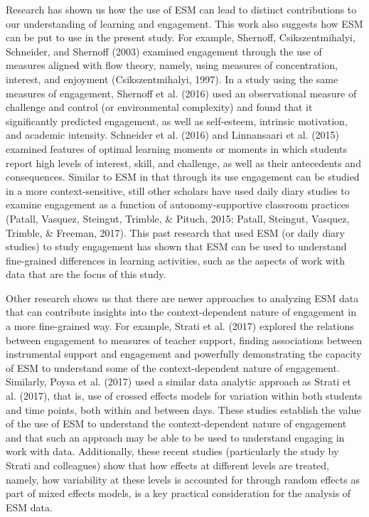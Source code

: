 \documentclass[]{msu-thesis}
\theoremstyle{definition}
\theoremstyle{definition}
\theoremstyle{definition}
\theoremstyle{remark}
\begin{document}
Research has shown us how the use of ESM can lead to distinct
contributions to our understanding of learning and engagement. This work
also suggests how ESM can be put to use in the present study. For
example, Shernoff, Csikszentmihalyi, Schneider, and Shernoff (2003)
examined engagement through the use of measures aligned with flow
theory, namely, using measures of concentration, interest, and enjoyment
(Csikszentmihalyi, 1997). In a study using the same measures of
engagement, Shernoff et al. (2016) used an observational measure of
challenge and control (or environmental complexity) and found that it
significantly predicted engagement, as well as self-esteem, intrinsic
motivation, and academic intensity. Schneider et al. (2016) and
Linnansaari et al. (2015) examined features of optimal learning moments
or moments in which students report high levels of interest, skill, and
challenge, as well as their antecedents and consequences. Similar to ESM
in that through its use engagement can be studied in a more
context-sensitive, still other scholars have used daily diary studies to
examine engagement as a function of autonomy-supportive classroom
practices (Patall, Vasquez, Steingut, Trimble, \& Pituch, 2015; Patall,
Steingut, Vasquez, Trimble, \& Freeman, 2017). This past research that
used ESM (or daily diary studies) to study engagement has shown that ESM
can be used to understand fine-grained differences in learning
activities, such as the aspects of work with data that are the focus of
this study.

Other research shows us that there are newer approaches to analyzing ESM
data that can contribute insights into the context-dependent nature of
engagement in a more fine-grained way. For example, Strati et al. (2017)
explored the relations between engagement to measures of teacher
support, finding associations between instrumental support and
engagement and powerfully demonstrating the capacity of ESM to
understand some of the context-dependent nature of engagement.
Similarly, Poysa et al. (2017) used a similar data analytic approach as
Strati et al. (2017), that is, use of crossed effects models for
variation within both students and time points, both within and between
days. These studies establish the value of the use of ESM to understand
the context-dependent nature of engagement and that such an approach may
be able to be used to understand engaging in work with data.
Additionally, these recent studies (particularly the study by Strati and
colleagues) show that how effects at different levels are treated,
namely, how variability at these levels is accounted for through random
effects as part of mixed effects models, is a key practical
consideration for the analysis of ESM data.
\end{document}

